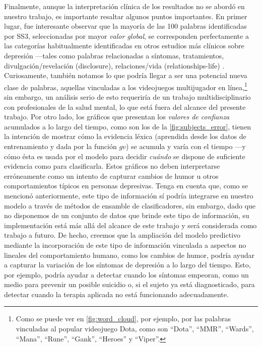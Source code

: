 Finalmente, aunque la interpretación clínica de los resultados no se abordó en nuestro trabajo, es importante resaltar algunos puntos importantes.
En primer lugar, fue interesante observar que la mayoría de las 100 palabras identificadas por SS3, seleccionadas por mayor \emph{valor global}, se corresponden perfectamente a las categorías habitualmente identificadas en otros estudios más clínicos sobre depresión ---tales como palabras relacionadas a síntomas, tratamientos, divulgación/revelación (disclosure), relaciones/vida (relationships-life) \cite{ de2013social}.
Curiosamente, también notamos lo que podría llegar a ser una potencial nueva clase de palabras, aquellas vinculadas a los videojuegos multijugador en línea,\footnote{Como se puede ver en \autoref{fig:word_cloud}, por ejemplo, por las palabras vinculadas al popular videojuego Dota, como son ``Dota'', ``MMR'', ``Wards'', ``Mana'', ``Rune'', ``Gank'', ``Heroes'' y ``Viper''.}   sin embargo, un análisis serio de esto requeriría de un trabajo multidisciplinario con profesionales de la salud mental, lo que está fuera del alcance del presente trabajo.
Por otro lado, los gráficos que presentan los \emph{valores de confianza} acumulados a lo largo del tiempo, como son los de la \autoref{fig:subjects_error}, tienen la intención de mostrar cómo la evidencia léxica (aprendida desde los datos de entrenamiento y dada por la función $gv$) se acumula y varía con el tiempo ---y cómo ésta es usada por el modelo para decidir \emph{cuándo} se dispone de suficiente evidencia como para clasificarla.
Estos gráficos no deben interpretarse erróneamente como un intento de capturar cambios de humor u otros comportamientos típicos en personas depresivas.
Tenga en cuenta que, como se mencionó anteriormente, este tipo de información sí podría integrarse en nuestro modelo a través de métodos de ensamble de clasificadores, sin embargo, dado que no disponemos de un conjunto de datos que brinde este tipo de información, su implementación está más allá del alcance de este trabajo y será considerada como trabajo a futuro.
De hecho, creemos que la ampliación del modelo predictivo mediante la incorporación de este tipo de información vinculada a aspectos no lineales del comportamiento humano, como los cambios de humor, podría ayudar a capturar la variación de los síntomas de depresión a lo largo del tiempo.
Esto, por ejemplo, podría ayudar a detectar cuando los síntomas empeoran, como un medio para prevenir un posible suicidio o, si el sujeto ya está diagnosticado, para detectar cuando la terapia aplicada no está funcionando adecuadamente.
